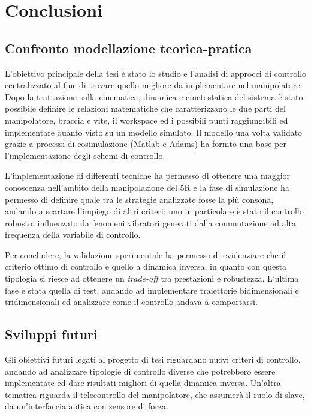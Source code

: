 \section{Conclusioni}
\subsection{Confronto modellazione teorica-pratica}
L'obiettivo principale della tesi è stato lo studio e l'analisi di approcci di controllo centralizzato al fine di trovare quello migliore da implementare nel manipolatore.
\\Dopo la trattazione sulla cinematica, dinamica e cinetostatica del sistema è stato possibile definire le relazioni matematiche che caratterizzano le due parti del manipolatore, braccia e vite, il workspace ed i possibili punti raggiungibili ed implementare quanto visto su un modello simulato. Il modello una volta validato grazie a processi di cosimulazione (Matlab e Adams) ha fornito una base per l'implementazione degli schemi di controllo.
\par L'implementazione di differenti tecniche ha permesso di ottenere una maggior conoscenza nell'ambito della manipolazione del 5R e la fase di simulazione ha permesso di definire quale tra le strategie analizzate fosse la più consona, andando a scartare l'impiego di altri criteri; uno in particolare è stato il controllo robusto, influenzato da fenomeni vibratori generati dalla commutazione ad alta frequenza della variabile di controllo.
\par Per concludere, la validazione sperimentale ha permesso di evidenziare che il criterio ottimo di controllo è quello a dinamica inversa, in quanto con questa tipologia si riesce ad ottenere un \textit{trade-off} tra prestazioni e  robustezza. L'ultima fase è stata quella di test, andando ad implementare traiettorie bidimensionali e tridimensionali ed analizzare come il controllo andava a comportarsi.
\subsection{Sviluppi futuri}
Gli obiettivi futuri legati al progetto di tesi riguardano nuovi criteri di controllo, andando ad analizzare tipologie di controllo diverse che potrebbero essere implementate ed dare risultati migliori di quella dinamica inversa. Un'altra tematica riguarda il telecontrollo del manipolatore, che assumerà il ruolo di slave, da un'interfaccia aptica con sensore di forza.

